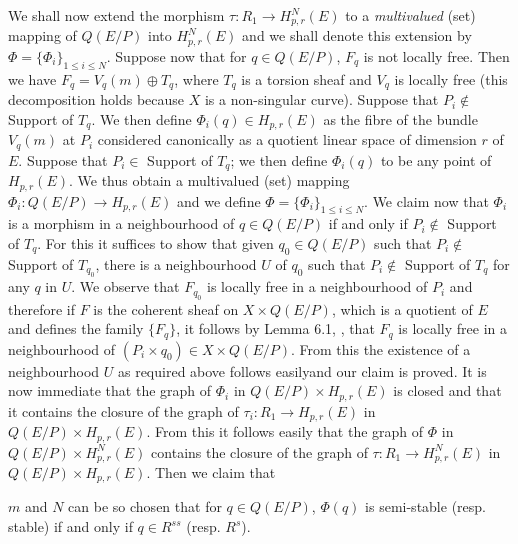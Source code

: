 We shall now extend the morphism $\tau:R_{1}\to H^{N}_{p,r}(E)$ to a {\em multivalued} (set) mapping of $Q(E/P)$ into $H^{N}_{p,r}(E)$ and we shall denote this extension by $\Phi=\{\Phi_{i}\}_{1\leq i\leq N}$. Suppose now that for $q\in Q(E/P)$, $F_{q}$ is not locally free. Then we have $F_{q}=V_{q}(m)\oplus T_{q}$, where $T_{q}$ is a torsion sheaf and $V_{q}$ is locally free (this decomposition holds because $X$ is a non-singular curve). Suppose that $P_{i}\not\in$ Support of $T_{q}$. We then define $\Phi_{i}(q)\in H_{p,r}(E)$ as the fibre of the bundle $V_{q}(m)$ at $P_{i}$ considered canonically as a quotient linear space of dimension $r$ of $E$. Suppose that $P_{i}\in$ Support of $T_{q}$; we then define $\Phi_{i}(q)$ to be any point of $H_{p,r}(E)$. We thus obtain a multivalued (set) mapping $\Phi_{i}:Q(E/P)\to H_{p,r}(E)$ and we define $\Phi=\{\Phi_{i}\}_{1\leq i\leq N}$. We claim now that $\Phi_{i}$ is a morphism in a neighbourhood of $q\in Q(E/P)$ if and only if $P_{i}\not\in$ Support of $T_{q}$. For this it suffices to show that given $q_{0}\in Q(E/P)$ such that $P_{i}\not\in$ Support of $T_{q_{0}}$, there is a neighbourhood $U$ of $q_{0}$ such that $P_{i}\not\in$ Support of $T_{q}$ for any $q$ in $U$. We observe that $F_{q_{0}}$ is locally free in a neighbourhood of $P_{i}$ and therefore if $F$ is the coherent sheaf on $X\times Q(E/P)$, which is a quotient of $E$ and defines the family $\{F_{q}\}$, it follows by Lemma 6.1, \cite{art18-key12}, that $F_{q}$ is locally free in a neighbourhood of $(P_{i}\times q_{0})\in X\times Q(E/P)$. From this the existence of a neighbourhood $U$ as required above follows easily\pageoriginale and our claim is proved. It is now immediate that the graph of $\Phi_{i}$ in $Q(E/P)\times H_{p,r}(E)$ is closed and that it contains the closure of the graph of $\tau_{i}:R_{1}\to H_{p,r}(E)$ in $Q(E/P)\times H_{p,r}(E)$. From this it follows easily that the graph of $\Phi$ in $Q(E/P)\times H^{N}_{p,r}(E)$ contains the closure of the graph of $\tau:R_{1}\to H^{N}_{p,r}(E)$ in $Q(E/P)\times H_{p,r}(E)$. Then we claim that

\begin{alphaclaim}\label{art18-claim-A}
$m$ and $N$ can be so chosen that for $q\in Q(E/P)$, $\Phi(q)$ is semi-stable (resp. stable) if and only if $q\in R^{ss}$ (resp. $R^{s}$).
\end{alphaclaim}

